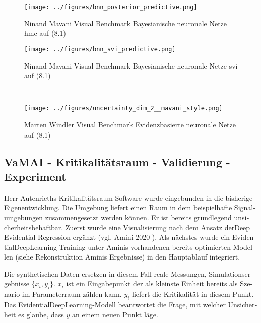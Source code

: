 \begin{otherlanguage}{ngerman}
\begin{figure}[!h]
  \centering
  \begin{minipage}{0.5\textwidth}
      \centering
      \texttt{[image: ../figures/bnn\_posterior\_predictive.png]}
      \caption{Ninand Mavani Visual Benchmark \gls{Bayesianische neuronale Netze} \gls{hmc} auf (8.1)}
  \end{minipage}%
  \begin{minipage}{0.5\textwidth}
      \centering
      \texttt{[image: ../figures/bnn\_svi\_predictive.png]}
      \caption{Ninand Mavani Visual Benchmark \gls{Bayesianische neuronale Netze} \gls{svi} auf (8.1)}
  \end{minipage}
  \\[1em]
  \begin{minipage}{0.5\textwidth}
      \centering
      \texttt{[image: ../figures/uncertainty\_dim\_2\_\_mavani\_style.png]}
      \caption{Marten Windler Visual Benchmark \gls{Evidenzbasierte neuronale Netze} auf (8.1)}
  \end{minipage}
\end{figure}



\subsection*{VaMAI - Kritikalitätsraum - Validierung - Experiment}

Herr Autenrieths Kritikalitätsraum-Software wurde eingebunden in die bisherige Eigenentwicklung. Die Umgebung liefert einen Raum in dem beispielhafte Signalumgebungen 
zusammengesetzt werden können. Er ist bereits grundlegend unsicherheitsbehaftbar. Zuerst wurde eine Visualisierung nach dem Ansatz der\glqq{}Deep Evidential Regression\grqq{} ergänzt (vgl. Amini 2020 \parencite{amini2020}). Als nächstes wurde ein \gls{EvidentialDeepLearning}-Training unter Aminis vorhandenen bereits optimierten Modellen (siehe Rekonstruktion Aminis Ergebnisse) in den Hauptablauf integriert. 

Die synthetischen Daten ersetzen in diesem Fall reale Messungen, Simulationsergebnisse $\{ x_{i}, y_{i} \}$. $x_{i}$ ist ein Eingabepunkt der als kleinste Einheit bereits als Szenario im Parameterraum zählen kann. $y_{i}$ liefert die Kritikalität in diesem Punkt. Das \gls{EvidentialDeepLearning}-Modell beantwortet die Frage, mit welcher Unsicherheit es glaube, dass $y$ an einem neuen Punkt läge. 


\end{otherlanguage}
